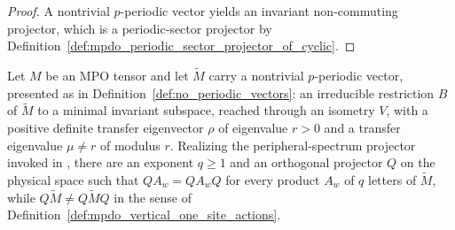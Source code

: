 \begin{proof}
    \leanok
    A nontrivial $p$-periodic vector yields an invariant non-commuting
    projector, which is a periodic-sector projector by
    Definition~\ref{def:mpdo_periodic_sector_projector_of_cyclic}.
\end{proof}

\begin{lemma}
    \label{thm:mpdo_displaced_invariant_projector}
    \leanok
    Let $M$ be an MPO tensor and let $\widetilde M$ carry a nontrivial
    $p$-periodic vector, presented as in
    Definition~\ref{def:no_periodic_vectors}: an irreducible restriction
    $B$ of $\widetilde M$ to a minimal invariant subspace, reached through
    an isometry $V$, with a positive definite transfer eigenvector $\rho$
    of eigenvalue $r>0$ and a transfer eigenvalue $\mu\ne r$ of modulus
    $r$. Realizing the peripheral-spectrum projector invoked in
    \cite[Proposition~4.13, lines~1889--1891]{Cirac2016MPDO_arXiv}, there
    are an exponent $q\ge 1$ and an orthogonal projector $Q$ on the
    physical space such that $QA_w=QA_wQ$ for every product $A_w$ of $q$
    letters of $\widetilde M$, while $Q\widetilde M\ne Q\widetilde MQ$ in
    the sense of Definition~\ref{def:mpdo_vertical_one_site_actions}.
\end{lemma}

